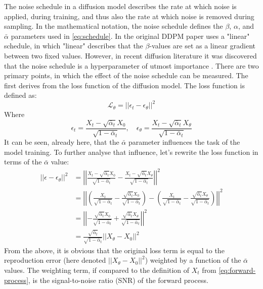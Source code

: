 The noise schedule in a diffusion model describes the rate at which noise is applied, during training, and thus also the rate at which noise is removed during sampling. In the mathematical notation, the noise schedule defines the $\beta$, $\alpha$, and $\bar{\alpha}$ parameters used in \cref{eq:schedule}. In the original DDPM paper \cite{ddpm} uses a "linear" schedule, in which "linear" describes that the $\beta$-values are set as a linear gradient between two fixed values. However, in recent diffusion literature it was discovered that the noise schedule is a hyperparameter of utmost importance \cite{edm}. There are two primary points, in which the effect of the noise schedule can be measured. The first derives from the loss function of the diffusion model. The loss function is defined as:
\begin{equation}
    \mathcal{L}_{\theta} = ||\epsilon_t - \epsilon_{\theta}||^2
\end{equation}
Where
\begin{equation}
    \epsilon_t = \frac{X_t - \sqrt{\bar{\alpha}_t}X_0}{\sqrt{1-\bar{\alpha}_t}}, \quad \epsilon_{\theta} = \frac{X_t - \sqrt{\bar{\alpha}_t}X_{\theta}}{\sqrt{1-\bar{\alpha}_t}}
\end{equation}
It can be seen, already here, that the $\bar{\alpha}$ parameter influences the task of the model training. To further analyse that influence, let's rewrite the loss function in terms of the $\bar{\alpha}$ value:
\begin{align}
    || \epsilon - \epsilon_{\theta}||^2 &= 
    \left| \left| \frac{X_t - \sqrt{\bar{\alpha}_t}X_0}{\sqrt{1-\bar{\alpha}_t}} - \frac{X_t - \sqrt{\bar{\alpha}_t}X_{\theta}}{\sqrt{1-\bar{\alpha}_t}} \right| \right|^2 \\
    &= \left| \left| \left( \frac{X_t}{\sqrt{1-\bar{\alpha}_t}} - \frac{\sqrt{\bar{\alpha}_t}X_0}{\sqrt{1-\bar{\alpha}_t}} \right) - \left( \frac{X_t}{\sqrt{1-\bar{\alpha}_t}} -\frac{\sqrt{\bar{\alpha}_t}X_{\theta}}{\sqrt{1-\bar{\alpha}_t}} \right) \right| \right| ^2 \\
    &= \left| \left| - \frac{\sqrt{\bar{\alpha}_t}X_0}{\sqrt{1-\bar{\alpha}_t}} + \frac{\sqrt{\bar{\alpha}_t}X_{\theta}}{\sqrt{1-\bar{\alpha}_t}} \right| \right| ^2 \\
    &= \frac{\sqrt{\bar{\alpha}_t}}{\sqrt{1-\bar{\alpha}_t}} \left| \left| X_{\theta} - X_0 \right| \right| ^2
\end{align}
From the above, it is obvious that the original loss term is equal to the reproduction error (here denoted $||X_{\theta} - X_0||^2$) weighted by a function of the $\bar{\alpha}$ values. The weighting term, if compared to the definition of $X_t$ from \cref{eq:forward-process}, is the signal-to-noise ratio (SNR) of the forward process.

